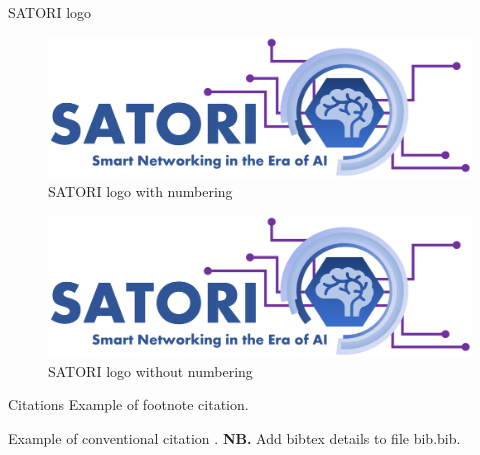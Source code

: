 \documentclass[aspectratio=169,t]{beamer}
\begin{document}
\begin{frame}{SATORI logo}
    \begin{minipage}[t]{0.49\linewidth}
        \begin{figure}
            \centering
            \includegraphics[width=0.3\linewidth]{logos/satori-big-logo.pdf}
            \caption{SATORI logo with numbering}
        \end{figure}
    \end{minipage}
    \begin{minipage}[t]{0.49\linewidth}
        \begin{figure}
            \centering
            \includegraphics[width=0.3\linewidth]{logos/satori-big-logo.pdf}
            \caption*{SATORI logo without numbering}
        \end{figure}
    \end{minipage}
\end{frame}

\begin{frame}{Citations}
    Example of footnote citation.
    
    Example of conventional citation \cite{icc20-netsharing}.
    \vfill
    \textbf{NB.} Add bibtex details to file bib.bib.
\end{frame}
\end{document}
